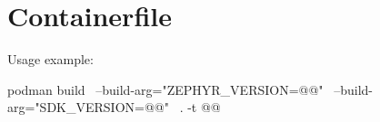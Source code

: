 \newpage
\fancyfoot{}

\section{Containerfile}\label{containerfile}



Usage example:

\begin{monobox}
podman build \
  --build-arg="ZEPHYR_VERSION=@\zephyrversion{}@" \
  --build-arg="SDK_VERSION=@\sdkversion{}@" \
  . -t @\imagename{}@
\end{monobox}



